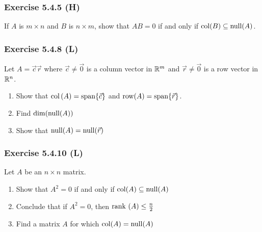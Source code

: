 \documentclass[pdf,9pt,t]{beamer}
\begin{document}
\begin{frame}[fragile]
    \frametitle{Exercise 5.4.5  (H)}
    \begin{problem}
	If $A$ is $m \times n$ and $B$ is $n \times m$, show that $AB=0$ if and only if $\mbox{col}(B)\subseteq \mbox{null}(A)$.
    \end{problem}

\end{frame}
\begin{frame}[fragile]
    \frametitle{Exercise 5.4.8  (L)}
    \begin{problem}
	Let $A= \vec{c} \vec{r}$ where $\vec{c}\ne \vec{0}$ is a column vector in $\mathbb{R}^m$ and $\vec{r}\ne \vec{0}$ is a row vector in $\mathbb{R}^n$.
	\begin{enumerate}
	    \item Show that $\mbox{col}\left(A\right) = \mbox{span}\{\vec{c} \}$ and $\mbox{row}(A) = \mbox{span}\{\vec{r} \}$.
	    \item Find $\dim(\mbox{null}(A))$
	    \item Show that $\mbox{null}(A)=\mbox{null}(\vec{r} )$
	\end{enumerate}
    \end{problem}

\end{frame}
\begin{frame}[fragile]
    \frametitle{Exercise 5.4.10 (L)}
    \begin{problem}
	Let $A$ be an $n \times n$ matrix.
	\begin{enumerate}
	    \item Show that $A^2=0$ if and only if $\mbox{col}(A)\subseteq \mbox{null}(A)$
	    \item Conclude that if $A^2=0$, then $\mbox{rank }(A)\le \frac{n}{2}$
	    \item Find a matrix $A$ for which $\mbox{col}(A)=\mbox{null}(A)$
	\end{enumerate}
    \end{problem}

\end{frame}
\end{document}
